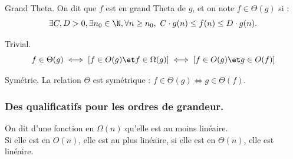\documentclass[french, 11pt]{article}
\begin{document}
\vspace*{-0.3cm}

\begin{defi}{Grand Theta.}{}
    On dit que $f$ est en grand Theta de $g$, et on note $f\in\Theta(g)$ si :
    \begin{equation*}
        \exists C,D>0, \exists n_0 \in \N, \forall n \geq n_0, ~ C\cdot g(n) \leq f(n) \leq D\cdot g(n).
    \end{equation*}
\end{defi}

\vspace*{-0.3cm}

\begin{prop}{Trivial.}{}
    \begin{equation*}
        f\in\Theta(g) \iff \left[f\in O(g) \et f\in\Omega(g)\right] \iff \left[f\in O(g) \et g \in O(f)\right]
    \end{equation*}
\end{prop}

\vspace*{-0.3cm}

\begin{prop}{Symétrie.}{}
    La relation $\Theta$ est symétrique : $f \in \Theta(g) \iff g \in \Theta(f)$.
\end{prop}

\subsubsection{Des qualificatifs pour les ordres de grandeur.}

\begin{defi}{}{}
    On dit d'une fonction en $\Omega(n)$ qu'elle est au moins linéaire.\\
    Si elle est en $O(n)$, elle est au plus linéaire, si elle est en $\Theta(n)$, elle est linéaire.
\end{defi}

\vspace*{-0.3cm}
\end{document}
